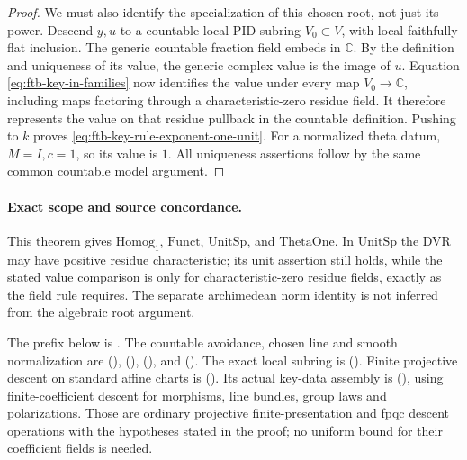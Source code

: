 \begin{proof}
We must also identify the specialization of this chosen
root, not just its power.
Descend \(y,u\) to a countable local PID subring
\(V_0\subset V\), with local faithfully flat inclusion.
The generic countable fraction field embeds in \(\mathbb C\).
By the definition and uniqueness of its value, the
generic complex value is the image of \(u\).
Equation \eqref{eq:ftb-key-in-families} now identifies the
value under every map \(V_0\to\mathbb C\), including maps
factoring through a characteristic-zero residue field.
It therefore represents the value on that residue
pullback in the countable definition.
Pushing to \(k\) proves
\eqref{eq:ftb-key-rule-exponent-one-unit}.
For a normalized theta datum, \(M=I,c=1\), so its value
is \(1\).
All uniqueness assertions follow by the same common
countable model argument.
\end{proof}

\paragraph{Exact scope and source concordance.}
This theorem gives \(\mathrm{Homog}_1\), \(\mathrm{Funct}\),
\(\mathrm{UnitSp}\), and \(\mathrm{ThetaOne}\).
In \(\mathrm{UnitSp}\) the DVR may have positive residue
characteristic; its unit assertion still holds, while the
stated value comparison is only for characteristic-zero
residue fields, exactly as the field rule requires.
The separate archimedean norm identity is not inferred
from the algebraic root argument.

The prefix below is
.
The countable avoidance, chosen line and smooth normalization
are 
(),
(),
(),
and 
().
The exact local subring is
().
Finite projective descent on standard affine charts is
().
Its actual key-data assembly is
(),
using finite-coefficient descent for morphisms, line bundles,
group laws and polarizations.
Those are ordinary projective finite-presentation and fpqc
descent operations with the hypotheses stated in the proof;
no uniform bound for their coefficient fields is needed.

